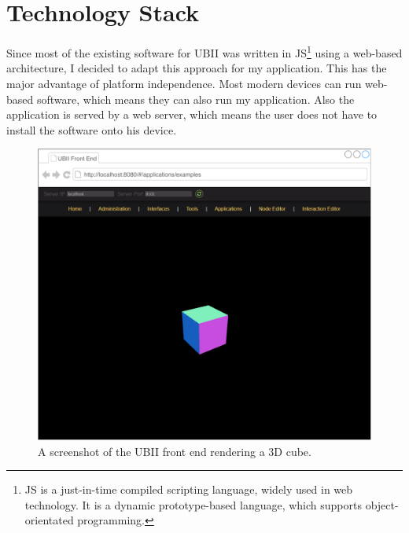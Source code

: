 \section{Technology Stack}\label{section:technology-stack}

Since most of the existing software for \ac{UBII} was written in \acf{JS}\footnote{\ac{JS} is a just-in-time compiled scripting language, widely used in web technology. It is a dynamic prototype-based language, which supports object-orientated programming.} using a web-based architecture, I decided to adapt this approach for my application. This has the major advantage of platform independence. Most modern devices can run web-based software, which means they can also run my application. Also the application is served by a web server, which means the user does not have to install the software onto his device.

\begin{figure}[htpb]
  \centering
  \includegraphics[width=12cm]{figures/ubii_front_end.pdf}
  \caption[Screenshot of the UBII front end]{A screenshot of the UBII front end rendering a 3D cube.}\label{fig:ubii-front-end}
\end{figure}

